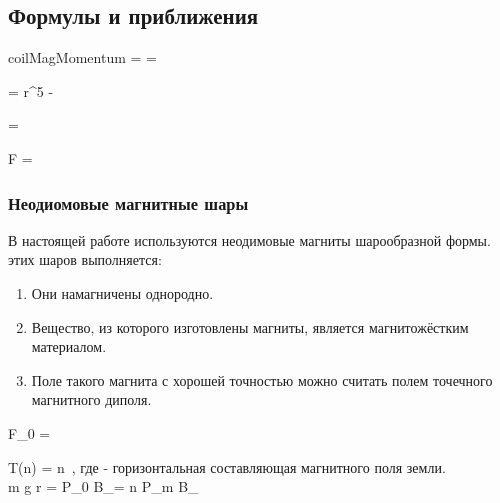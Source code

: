 \begin{center}
{\begin{center}
    \end{center}
}
\end{center}

\subsection{Формулы и приближения}

 {coilMagMomentum}
{
     =  \cdot {} =  \cdot {}
}

{
     =  {r^5} - 
}

{
     =  \times {}
}

{
    F = 
}

\subsubsection{Неодиомовые магнитные шары}
В настоящей работе используются неодимовые магниты шарообразной формы.
 этих шаров выполняется:

\shiftedText{0.3cm}{14cm}
{
    \begin{enumerate}
        \item Они намагничены однородно.
        \item Вещество, из которого изготовлены магниты, является магнитожёстким материалом.
        \item Поле такого магнита с хорошей точностью можно считать полем точечного магнитного диполя.
    \end{enumerate}
}

\newpage

{
    F_0 = 
}

{
    T(n) = \pi n \,,
}
где  - горизонтальная составляющая магнитного поля земли. \\[0.5cm]

{
    m g r = P_0 B_\nu = n P_m B_\nu
}